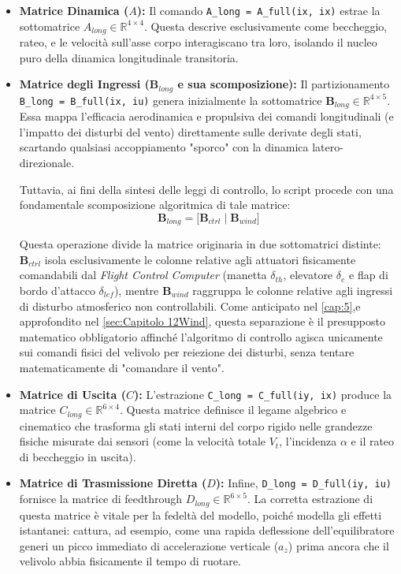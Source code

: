 \begin{itemize}
    \item \textbf{Matrice Dinamica ($A$):} Il comando \texttt{A\_long = A\_full(ix, ix)} estrae la sottomatrice $A_{long} \in \mathbb{R}^{4 \times 4}$. Questa descrive esclusivamente come beccheggio, rateo, e le velocità sull'asse corpo interagiscano tra loro, isolando il nucleo puro della dinamica longitudinale transitoria.
    \item \textbf{Matrice degli Ingressi ($\mathbf{B}_{long}$ e sua scomposizione):} Il partizionamento \texttt{B\_long = B\_full(ix, iu)} genera inizialmente la sottomatrice $\mathbf{B}_{long} \in \mathbb{R}^{4 \times 5}$. Essa mappa l'efficacia aerodinamica e propulsiva dei comandi longitudinali (e l'impatto dei disturbi del vento) direttamente sulle derivate degli stati, scartando qualsiasi accoppiamento "sporco" con la dinamica latero-direzionale. 
    
    Tuttavia, ai fini della sintesi delle leggi di controllo, lo script procede con una fondamentale scomposizione algoritmica di tale matrice:
    \begin{equation}
    	\mathbf{B}_{long} = \big[ \mathbf{B}_{ctrl} \;\big|\; \mathbf{B}_{wind} \big]
    \end{equation}
    
    Questa operazione divide la matrice originaria in due sottomatrici distinte: $\mathbf{B}_{ctrl}$ isola esclusivamente le colonne relative agli attuatori fisicamente comandabili dal \textit{Flight Control Computer} (manetta $\delta_{th}$, elevatore $\delta_e$ e flap di bordo d'attacco $\delta_{lef}$), mentre $\mathbf{B}_{wind}$ raggruppa le colonne relative agli ingressi di disturbo atmosferico non controllabili. Come anticipato nel \ref{cap:5},e approfondito nel \ref{sec:Capitolo 12Wind}, questa separazione è il presupposto matematico obbligatorio affinché l'algoritmo di controllo agisca unicamente sui comandi fisici del velivolo per reiezione dei disturbi, senza tentare matematicamente di "comandare il vento".

    \item \textbf{Matrice di Uscita ($C$):} L'estrazione \texttt{C\_long = C\_full(iy, ix)} produce la matrice $C_{long} \in \mathbb{R}^{6 \times 4}$. Questa matrice definisce il legame algebrico e cinematico che trasforma gli stati interni del corpo rigido nelle grandezze fisiche misurate dai sensori (come la velocità totale $V_t$, l'incidenza $\alpha$ e il rateo di beccheggio in uscita).

    \item \textbf{Matrice di Trasmissione Diretta ($D$):} Infine, \texttt{D\_long = D\_full(iy, iu)} fornisce la matrice di feedthrough $D_{long} \in \mathbb{R}^{6 \times 5}$. La corretta estrazione di questa matrice è vitale per la fedeltà del modello, poiché modella gli effetti istantanei: cattura, ad esempio, come una rapida deflessione dell'equilibratore generi un picco immediato di accelerazione verticale ($a_z$) prima ancora che il velivolo abbia fisicamente il tempo di ruotare.
\end{itemize}


